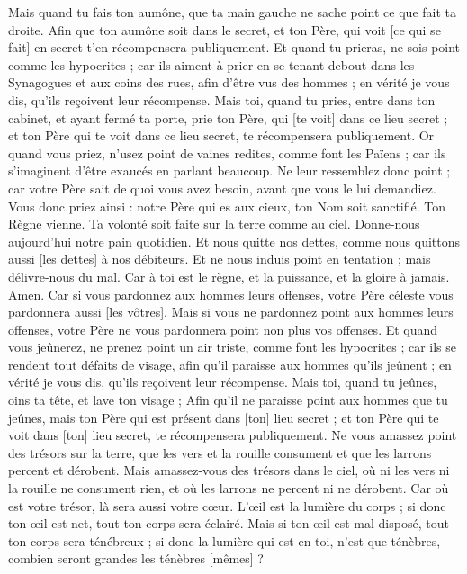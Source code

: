\begin{multicols}{2}
Mais quand tu fais ton aumône, que ta main gauche ne sache point ce que fait ta droite.
Afin que ton aumône soit dans le secret, et ton Père, qui voit [ce qui se fait] en secret t'en récompensera publiquement.
Et quand tu prieras, ne sois point comme les hypocrites ; car ils aiment à prier en se tenant debout dans les Synagogues et aux coins des rues, afin d'être vus des hommes ; en vérité je vous dis, qu'ils reçoivent leur récompense.
Mais toi, quand tu pries, entre dans ton cabinet, et ayant fermé ta porte, prie ton Père, qui [te voit] dans ce lieu secret ; et ton Père qui te voit dans ce lieu secret, te récompensera publiquement.
Or quand vous priez, n'usez point de vaines redites, comme font les Païens ; car ils s'imaginent d'être exaucés en parlant beaucoup.
Ne leur ressemblez donc point ; car votre Père sait de quoi vous avez besoin, avant que vous le lui demandiez.
Vous donc priez ainsi : notre Père qui es aux cieux, ton Nom soit sanctifié.
Ton Règne vienne. Ta volonté soit faite sur la terre comme au ciel.
Donne-nous aujourd'hui notre pain quotidien.
Et nous quitte nos dettes, comme nous quittons aussi [les dettes] à nos débiteurs.
Et ne nous induis point en tentation ; mais délivre-nous du mal. Car à toi est le règne, et la puissance, et la gloire à jamais. Amen.
Car si vous pardonnez aux hommes leurs offenses, votre Père céleste vous pardonnera aussi [les vôtres].
Mais si vous ne pardonnez point aux hommes leurs offenses, votre Père ne vous pardonnera point non plus vos offenses.
Et quand vous jeûnerez, ne prenez point un air triste, comme font les hypocrites ; car ils se rendent tout défaits de visage, afin qu'il paraisse aux hommes qu'ils jeûnent ; en vérité je vous dis, qu'ils reçoivent leur récompense.
Mais toi, quand tu jeûnes, oins ta tête, et lave ton visage ;
Afin qu'il ne paraisse point aux hommes que tu jeûnes, mais ton Père qui est présent dans [ton] lieu secret ; et ton Père qui te voit dans [ton] lieu secret, te récompensera publiquement.
Ne vous amassez point des trésors sur la terre, que les vers et la rouille consument et que les larrons percent et dérobent.
Mais amassez-vous des trésors dans le ciel, où ni les vers ni la rouille ne consument rien, et où les larrons ne percent ni ne dérobent.
Car où est votre trésor, là sera aussi votre cœur.
L'œil est la lumière du corps ; si donc ton œil est net, tout ton corps sera éclairé.
Mais si ton œil est mal disposé, tout ton corps sera ténébreux ; si donc la lumière qui est en toi, n'est que ténèbres, combien seront grandes les ténèbres [mêmes] ?

\end{multicols}
